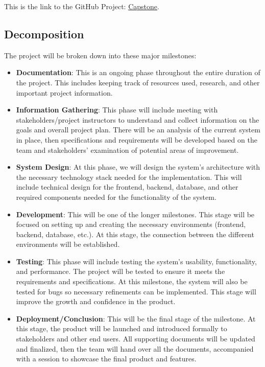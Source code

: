 \documentclass{article}
\begin{document}
This is the link to the GitHub Project: \href{https://github.com/users/dcheung11/projects/1}{Capstone}.

\subsection{Decomposition}
The project will be broken down into these major milestones:

\begin{itemize}
    \item \textbf{Documentation}: This is an ongoing phase throughout the entire duration of the project. This includes keeping track of resources used, research, and other important project information.
    \item \textbf{Information Gathering}: This phase will include meeting with stakeholders/project instructors to understand and collect information on the goals and overall project plan. There will be an analysis of the current system in place, then specifications and requirements will be developed based on the team and stakeholders' examination of potential areas of improvement.
    \item \textbf{System Design}: At this phase, we will design the system's architecture with the necessary technology stack needed for the implementation. This will include technical design for the frontend, backend, database, and other required components needed for the functionality of the system.
    \item \textbf{Development}: This will be one of the longer milestones. This stage will be focused on setting up and creating the necessary environments (frontend, backend, database, etc.). At this stage, the connection between the different environments will be established.
    \item \textbf{Testing}: This phase will include testing the system's usability, functionality, and performance. The project will be tested to ensure it meets the requirements and specifications. At this milestone, the system will also be tested for bugs so necessary refinements can be implemented. This stage will improve the growth and confidence in the product.
    \item \textbf{Deployment/Conclusion}: This will be the final stage of the milestone. At this stage, the product will be launched and introduced formally to stakeholders and other end users. All supporting documents will be updated and finalized, then the team will hand over all the documents, accompanied with a session to showcase the final product and features.
\end{itemize}
\end{document}
